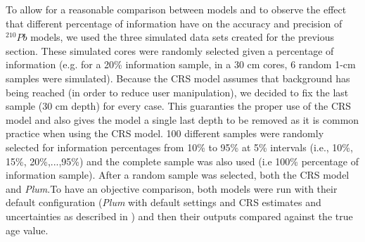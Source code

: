 \documentclass [10pt] {article}
\begin{document}
To allow for a reasonable comparison between models and to observe the effect that different percentage of information have on the accuracy and precision of $^{210}Pb$ models, we used the three simulated data sets created for the previous section. 
These simulated cores were randomly selected given a percentage of information (e.g. for a 20\% information sample, in a 30 cm cores, 6 random 1-cm samples were simulated). 
Because the CRS model assumes that background has being reached (in order to reduce user manipulation), we decided to fix the last sample (30 cm depth) for every case.
This guaranties the proper use of the CRS model and also gives the model a single last depth to be removed as it is common practice when using the CRS model.
100 different samples were randomly selected for information percentages from 10\% to 95\% at 5\% intervals (i.e., 10\%, 15\%, 20\%,...,95\%) and the complete sample was also used (i.e 100\% percentage of information sample).
After a random sample was selected, both the CRS model and \textit{Plum}.To have an objective comparison, both models were run with their default configuration (\textit{Plum} with default settings and CRS estimates and uncertainties as described in \citet{Appleby2001}) and then their outputs compared against the true age value.
\end{document}
